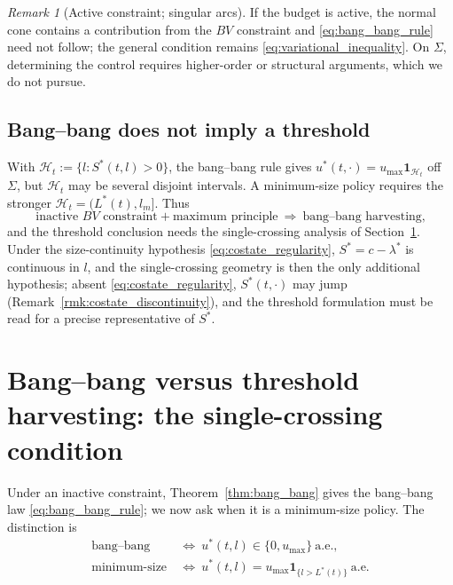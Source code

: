 \documentclass[pdflatex,sn-mathphys-num]{sn-jnl}
\theoremstyle{plain}
\theoremstyle{definition}
\theoremstyle{remark}
\newtheorem{remark}[theorem]{Remark}
\begin{document}
\begin{remark}[Active constraint; singular arcs]
\label{rmk:active_variation}
If the budget is active, the normal cone contains a contribution from the $BV$
constraint and \eqref{eq:bang_bang_rule} need not follow; the general condition
remains \eqref{eq:variational_inequality}. On $\Sigma$, determining the control
requires higher-order or structural arguments, which we do not pursue.
\end{remark}

\subsection{Bang--bang does not imply a threshold}
\label{subsec:bang_bang_not_threshold}

With $\mathcal H_t:=\{l:S^*(t,l)>0\}$, the bang--bang rule gives
$u^*(t,\cdot)=u_{\max}\mathbf 1_{\mathcal H_t}$ off $\Sigma$, but $\mathcal H_t$
may be several disjoint intervals. A minimum-size policy requires the stronger
$\mathcal H_t=(L^*(t),l_m]$. Thus
\[
\text{inactive $BV$ constraint}+\text{maximum principle}
\ \Longrightarrow\
\text{bang--bang harvesting,}
\]
and the threshold conclusion needs the single-crossing analysis of
Section~\ref{sec:threshold}. Under the size-continuity hypothesis
\eqref{eq:costate_regularity}, $S^*=c-\lambda^*$ is continuous in $l$, and the
single-crossing geometry is then the only additional hypothesis; absent
\eqref{eq:costate_regularity}, $S^*(t,\cdot)$ may jump (Remark~\ref{rmk:costate_discontinuity}),
and the threshold formulation must be read for a precise representative of
$S^*$.

\section{Bang--bang versus threshold harvesting: the single-crossing condition}
\label{sec:threshold}

Under an inactive constraint, Theorem~\ref{thm:bang_bang} gives the bang--bang law
\eqref{eq:bang_bang_rule}; we now ask when it is a minimum-size policy. The
distinction is
\[
\begin{aligned}
\text{bang--bang}
&\ \Longleftrightarrow\ u^*(t,l)\in\{0,u_{\max}\}\ \text{a.e.},\\
\text{minimum-size}
&\ \Longleftrightarrow\ u^*(t,l)=u_{\max}\mathbf 1_{\{l>L^*(t)\}}\ \text{a.e.}
\end{aligned}
\]
\end{document}
